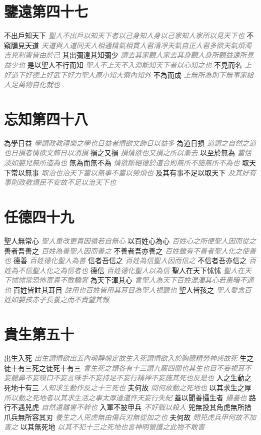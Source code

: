 \documentclass[a4paper,zihao=-4,oneside,landscape,UTF8]{ctexart}
\newcommand{\zhushi}[1]{\scriptsize{\textit{\textcolor{gray}{#1}}}\normalsize}
\begin{document}
\section{鑒遠第四十七}

不出戶知天下
\zhushi{聖人不出戶以知天下者以己身知人身以己家知人家所以見天下也}
不窺牖見天道
\zhushi{天道與人道同天人相通精氣相貫人君清凈天氣自正人君多欲天氣煩濁吉兇利害皆由於己}
其出彌遠其知彌少
\zhushi{謂去其家觀人家去其身觀人身所觀益遠所見益少也}
是以聖人不行而知
\zhushi{聖人不上天不入淵能知天下者以心知之也}
不見而名
\zhushi{上好道下好德上好武下好力聖人原小知大察內知外}
不為而成
\zhushi{上無所為則下無事家給人足萬物自化就也}


\section{忘知第四十八}

為學日益
\zhushi{學謂政教禮樂之學也日益者情欲文飾日以益多}
為道日損
\zhushi{道謂之自然之道也日損者情欲文飾日以消損}
損之又損
\zhushi{損情欲也又損之所以漸去}
以至於無為
\zhushi{當恬淡如嬰兒無所造為也}
無為而無不為
\zhushi{情欲斷絕德於道合則無所不施無所不為也}
取天下常以無事
\zhushi{取治也治天下當以無事不當以勞煩也}
及其有事不足以取天下
\zhushi{及其好有事則政教煩民不安故不足以治天下也}


\section{任德四十九}

聖人無常心
\zhushi{聖人重改更貴因循若自無心}
以百姓心為心
\zhushi{百姓心之所便聖人因而從之}
善者吾善之
\zhushi{百姓為善聖人因而善之}
不善者吾亦善之
\zhushi{百姓雖有不善者聖人化之使善也}
德善
\zhushi{百姓德化聖人為善}
信者吾信之
\zhushi{百姓為信聖人因而信之}
不信者吾亦信之
\zhushi{百姓為不信聖人化之為信者也}
德信
\zhushi{百姓德化聖人以為信}
聖人在天下怵怵
\zhushi{聖人在天下怵怵常恐怖富貴不敢驕奢}
為天下渾其心
\zhushi{言聖人為天下百姓混濁其心若愚暗不通也}
百姓皆註其耳目
\zhushi{註用也百姓皆用其耳目為聖人視聽也}
聖人皆孩之
\zhushi{聖人愛念百姓如嬰孩赤子長養之而不責望其報}


\section{貴生第五十}

出生入死
\zhushi{出生謂情欲出五內魂靜魄定故生入死謂情欲入於胸臆精勞神惑故死}
生之徒十有三死之徒死十有三
\zhushi{言生死之類各有十三謂九竅四關也其生也目不妄視耳不妄聽鼻不妄嗅口不妄言味手不妄持足不妄行精神不妄施其死也反是也}
人之生動之死地十有三
\zhushi{人知求生動作反之十三死也}
夫何故
\zhushi{問何故動之死地也}
以其求生之厚
\zhushi{所以動之死地者以其求生活之事太厚違道忤天妄行失紀}
蓋以聞善攝生者
\zhushi{攝養也}
路行不遇兕虎
\zhushi{自然遠離害不幹也}
入軍不披甲兵
\zhushi{不好戰以殺人}
兕無投其角虎無所措爪兵無所容其刃
\zhushi{養生之人兕虎無由傷兵刃無從加之也}
夫何故
\zhushi{問兕虎兵甲何故不加害之}
以其無死地
\zhushi{以其不犯十三之死地也言神明營護之此物不敢害}
\end{document}
